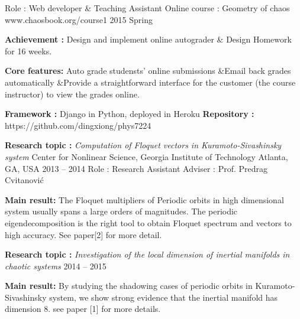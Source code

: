 


\begin{cventries}


\cventry
{Role : Web developer \& Teaching Assistant}
{Online course : Geometry of chaos}
{www.chaosbook.org/course1}
{2015 Spring}
{
  \begin{cvitems}
    \item {\textbf{Achievement : } Design and implement online autograder \& Design Homework for 16 weeks.}
    \item {\textbf{Core features:} Auto grade studensts' online submissions
        \quad\&\quad Email back grades automatically \quad\&\quad Provide a straightforward interface for the customer (the course instructor)
      to view the grades online.}
    \item {\textbf{Framework :} Django in Python, deployed in Heroku \quad
      \textbf{Repository :} {\color{black} https://github.com/dingxiong/phys7224} 
    }
  \end{cvitems}
}

\cventrymore
{\textbf{Research topic :} \emph{Computation of Floquet vectors in Kuramoto-Sivashinsky system}}
{Center for Nonlinear Science, Georgia Institute of Technology}
{Atlanta, GA, USA}
{2013 -- 2014}
{Role : Research Assistant \quad Adviser : Prof. Predrag Cvitanovi\'c }
{
  \begin{cvitems}
  \item {\textbf{Main result:} The Floquet multipliers of Periodic orbits in high dimensional system 
      usually spans a large orders of magnitudes. The periodic eigendecomposition is the right tool
      to obtain Floquet spectrum and vectors to high accuracy. See paper[2] for more detail.
    }
  \end{cvitems}
}

\cventry
{\textbf{Research topic :} \emph{Investigation of the local dimension of inertial manifolds in chaotic systems}}
{}{}
{2014 -- 2015}
{
  \begin{cvitems}
    \item {\textbf{Main result:} By studying the shadowing cases of periodic orbits in
        Kuramoto-Sivashinsky system, we show strong evidence that the inertial manifold has
        dimension 8. see paper [1] for more details.}
  \end{cvitems}
}


\end{cventries}
